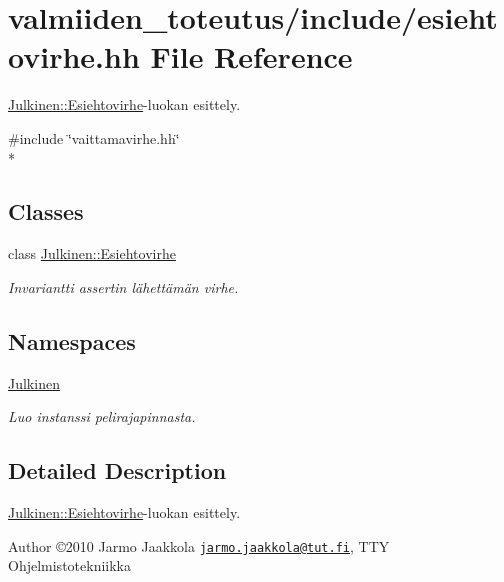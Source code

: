 \hypertarget{esiehtovirhe_8hh}{}\section{valmiiden\+\_\+toteutus/include/esiehtovirhe.hh File Reference}
\label{esiehtovirhe_8hh}


\hyperlink{class_julkinen_1_1_esiehtovirhe}{Julkinen\+::\+Esiehtovirhe}-\/luokan esittely.  


{\ttfamily \#include \char`\"{}vaittamavirhe.\+hh\char`\"{}}\\*
\subsection*{Classes}
\begin{DoxyCompactItemize}
\item 
class \hyperlink{class_julkinen_1_1_esiehtovirhe}{Julkinen\+::\+Esiehtovirhe}
\begin{DoxyCompactList}\small\item\em Invariantti assertin lähettämän virhe. \end{DoxyCompactList}\end{DoxyCompactItemize}
\subsection*{Namespaces}
\begin{DoxyCompactItemize}
\item 
 \hyperlink{namespace_julkinen}{Julkinen}
\begin{DoxyCompactList}\small\item\em Luo instanssi pelirajapinnasta. \end{DoxyCompactList}\end{DoxyCompactItemize}


\subsection{Detailed Description}
\hyperlink{class_julkinen_1_1_esiehtovirhe}{Julkinen\+::\+Esiehtovirhe}-\/luokan esittely. 

\begin{DoxyAuthor}{Author}
©2010 Jarmo Jaakkola \href{mailto:jarmo.jaakkola@tut.fi}{\tt jarmo.\+jaakkola@tut.\+fi}, T\+T\+Y Ohjelmistotekniikka 
\end{DoxyAuthor}
